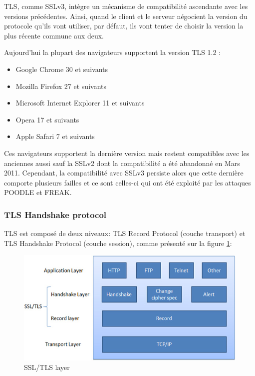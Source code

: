 TLS, comme SSLv3, intègre un mécanisme de compatibilité ascendante avec les versions précédentes. Ainsi, quand le client et le serveur négocient la version du protocole qu'ils vont utiliser, par défaut, ils vont tenter de choisir la version la plus récente commune aux deux. 

Aujourd'hui la plupart des navigateurs supportent la version TLS 1.2 : 
\begin{itemize}
\item Google Chrome 30 et suivants
\item Mozilla Firefox 27 et suivants
\item Microsoft Internet Explorer 11 et suivants
\item Opera 17 et suivants
\item Apple Safari 7 et suivants
\end{itemize}

Ces navigateurs supportent la dernière version mais restent compatibles avec les anciennes aussi sauf la SSLv2 dont la compatibilité a été abandonné en Mars 2011. Cependant, la compatibilité avec SSLv3 persiste alors que cette dernière comporte plusieurs failles et ce sont celles-ci qui ont été exploité par les attaques POODLE et FREAK.  


\subsubsection{TLS Handshake protocol}

TLS est composé de deux niveaux: TLS Record Protocol (couche transport) et TLS Handshake Protocol (couche session), comme présenté sur la figure \ref{ssl-tls-diag}: \\

\begin{figure}[H]
  \centering
  \includegraphics[scale=0.5]{img/ssl-tls-diag.jpg}
  \caption{SSL/TLS layer}
  \label{ssl-tls-diag}
\end{figure}  


